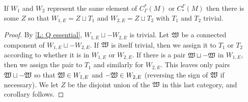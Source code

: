 \begin{corollary}\label{C: Q essential}
If $W_1$ and $W_2$ represent the same element of $C^*_\Gamma(M)$ or $C_*^\Gamma(M)$ then there is some $Z$ so that $W_{1,E}=Z\sqcup T_1$ and $W_{2,E}=Z\sqcup T_2$ with $T_1$ and $T_2$ trivial.
\end{corollary}
\begin{proof}
By \cref{L: Q essential}, $W_{1,E}\sqcup -W_{2,E}$ is trivial. Let $\mathfrak W$ be a connected component of $W_{1,E}\sqcup -W_{2,E}$. If $\mathfrak W$ is itself trivial, then we assign it to $T_1$ or $T_2$ according to whether it is in $W_{1,E}$ or $W_{2,E}$. If there is a pair $\mathfrak W\sqcup -\mathfrak W$ in $W_{1,E}$, then we assign the pair to $T_1$ and similarly for $W_{2,E}$. This leaves only pairs $\mathfrak W\sqcup -\mathfrak W$ so that $\mathfrak W\in W_{1,E}$ and $-\mathfrak W\in W_{2,E}$ (reversing the sign of $\mathfrak W$ if necessary). We let $Z$ be the disjoint union of the $\mathfrak W$ in this last category, and corollary follows.
\end{proof}





